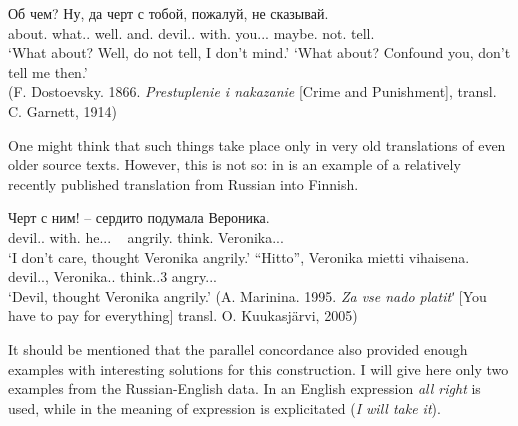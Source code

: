 \documentclass[output=paper]{langscibook}
\begin{document}
\ea
\gll Об чем? Ну, да черт с тобой, пожалуй, не сказывай.\\
     about.{\PREP} what.{\PRON}.{\LOC} well.{\PTCP} and.{\PTCP} devil.{\NOUN}.{\NOM} with.{\PREP} you.{\PRON}.{\INSTR}.{\SG} maybe.{\ADV} not.{\PTCP} tell.{\IMP}{\SG}\\
\glt `What about? Well, do not tell, I don’t mind.'
\glt `What about? Confound you, don’t tell me then.'\\(F. Dostoevsky. 1866. \textit{Prestuplenie i nakazanie} [Crime and Punishment], transl. C. Garnett, 1914)
\z

One might think that such things take place only in very old translations of even older source texts. However, this is not so: in  is an example of a relatively recently published translation from Russian into Finnish.

\ea
\gll Черт с ним! – сердито подумала Вероника.\\
     devil.{\NOUN}.{\NOM} with.{\PREP} he.{\PRON}.{\INSTR}.{\SG} ~ angrily.{\ADV} think.{\PAST}{\F}{\SG} Veronika.{\NOUNPROPER}.{\NOM}.\\
\glt `I don’t care, thought Veronika angrily.'
\ex
 \gll    ``Hitto'', Veronika mietti vihaisena.\\
     devil.{\NOUN}.{\NOM}, Veronika.{\NOUNPROPER}.{\NOM} think.{\PAST}.3{\SG} angry.{\ADJ}.{\ESSIVE}.{\SG}\\
\glt `Devil, thought Veronika angrily.' (A. Marinina. 1995. \textit{Za vse nado platitʹ} [You have to pay for everything] transl. O. Kuukasjärvi, 2005)
\z

It should be mentioned that the parallel concordance also provided enough examples with interesting solutions for this construction. I will give here only two examples from the Russian-English data. In  an English expression \textit{all right} is used, while in  the meaning of expression is explicitated (\textit{I will take it}).
\end{document}
